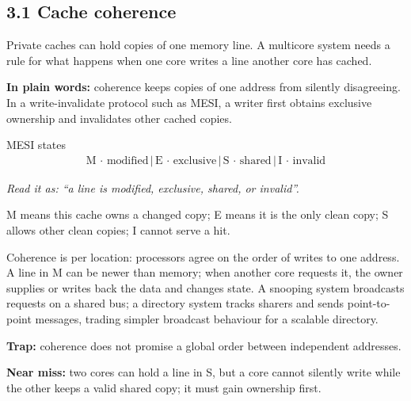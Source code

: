 \documentclass[11pt]{article}
\begin{document}
\begin{keepsection}
\section{3.1 Cache coherence}

Private caches can hold copies of one memory line. A multicore system needs a rule for what happens when one core writes a line another core has cached.

\begin{plainbox}\textbf{In plain words:} coherence keeps copies of one address from silently disagreeing. In a write-invalidate protocol such as MESI, a writer first obtains exclusive ownership and invalidates other cached copies.\end{plainbox}

\begin{equationcard}{MESI states}
\[ \begin{gathered} \mathrm{M}\, \cdot \, \text{modified}\, |\, \mathrm{E}\, \cdot \, \text{exclusive}\, |\, \mathrm{S}\, \cdot \, \text{shared}\, |\, \mathrm{I}\, \cdot \, \text{invalid} \end{gathered} \]
{\small \emph{Read it as: “a line is modified, exclusive, shared, or invalid”.}\par M means this cache owns a changed copy; E means it is the only clean copy; S allows other clean copies; I cannot serve a hit.}
\end{equationcard}

Coherence is per location: processors agree on the order of writes to one address. A line in M can be newer than memory; when another core requests it, the owner supplies or writes back the data and changes state. A snooping system broadcasts requests on a shared bus; a directory system tracks sharers and sends point-to-point messages, trading simpler broadcast behaviour for a scalable directory.

\begin{notebox}\textbf{Trap:} coherence does not promise a global order between independent addresses.\end{notebox}

\begin{notebox}\textbf{Near miss:} two cores can hold a line in S, but a core cannot silently write while the other keeps a valid shared copy; it must gain ownership first.\end{notebox}


\end{keepsection}
\end{document}
